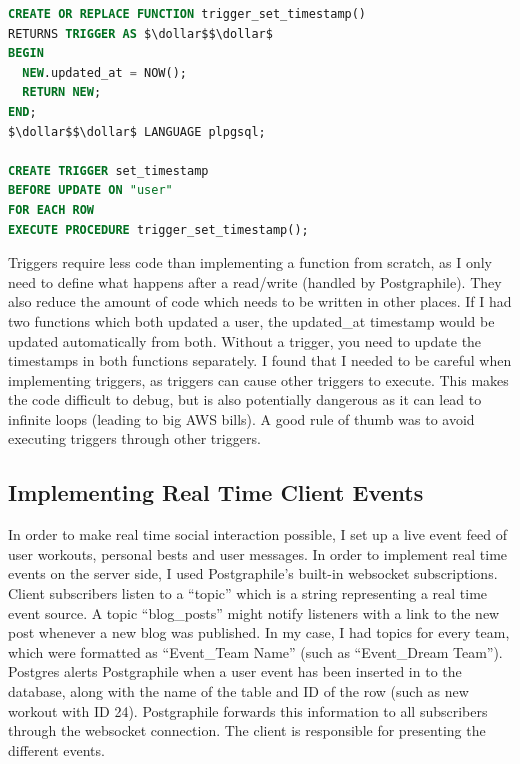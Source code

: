 \documentclass{l4proj}
\begin{document}
\begin{lstlisting}[language=SQL, caption={Definition of a function which sets the row's ``updated\_at'' column to be the current time, along with a trigger which binds it to user updates.}]
CREATE OR REPLACE FUNCTION trigger_set_timestamp()
RETURNS TRIGGER AS $\dollar$$\dollar$ 
BEGIN
  NEW.updated_at = NOW();
  RETURN NEW;
END;
$\dollar$$\dollar$ LANGUAGE plpgsql;

CREATE TRIGGER set_timestamp
BEFORE UPDATE ON "user"
FOR EACH ROW
EXECUTE PROCEDURE trigger_set_timestamp();
\end{lstlisting}

Triggers require less code than implementing a function from scratch, as I only need to define what happens after a read/write (handled by Postgraphile). They also reduce the amount of code which needs to be written in other places. If I had two functions which both updated a user, the updated\_at timestamp would be updated automatically from both. Without a trigger, you need to update the timestamps in both functions separately. I found that I needed to be careful when implementing triggers, as triggers can cause other triggers to execute. This makes the code difficult to debug, but is also potentially dangerous as it can lead to infinite loops (leading to big AWS bills). A good rule of thumb was to avoid executing triggers through other triggers.

\subsection{Implementing Real Time Client Events}
In order to make real time social interaction possible, I set up a live event feed of user workouts, personal bests and user messages. In order to implement real time events on the server side, I used Postgraphile's built-in websocket subscriptions. Client subscribers listen to a ``topic'' which is a string representing a real time event source. A topic ``blog\_posts'' might notify listeners with a link to the new post whenever a new blog was published. In my case, I had topics for every team, which were formatted as ``Event\_{Team Name}'' (such as ``Event\_Dream Team''). Postgres alerts Postgraphile when a user event has been inserted in to the database, along with the name of the table and ID of the row (such as new workout with ID 24). Postgraphile forwards this information to all subscribers through the websocket connection. The client is responsible for presenting the different events. 
\end{document}
